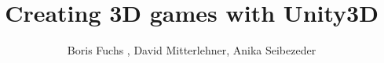 \documentclass[bachelor,english]{hgbthesis}
\title{Creating 3D games with Unity3D}
\author{Boris Fuchs , David Mitterlehner, Anika Seibezeder}
\begin{document}

\frontmatter							%

\maketitle
\tableofcontents

\mainmatter          			%








\MakeBibliography                        				%

\end{document}
